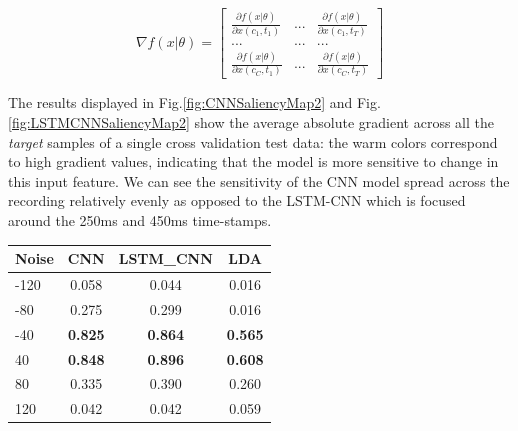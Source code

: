 \documentclass[
12pt, %
english, %
doublespacing, %
headsepline, %
]{MastersDoctoralThesis} %
\begin{document}
	\begin{equation}\label{eq:4}
	\nabla f\left( {x|\theta } \right) = \left[ {\begin{array}{*{20}{c}}
		{\frac{{\partial f\left( {x|\theta } \right)}}{{\partial x\left( {{c_1},{t_1}} \right)}}}&{...}&{\frac{{\partial f\left( {x|\theta } \right)}}{{\partial x\left( {{c_1},{t_T}} \right)}}}\\
		{...}&{...}&{...}\\
		{\frac{{\partial f\left( {x|\theta } \right)}}{{\partial x\left( {{c_C},{t_1}} \right)}}}&{...}&{\frac{{\partial f\left( {x|\theta } \right)}}{{\partial x\left( {{c_C},{t_T}} \right)}}}
		\end{array}} \right]
	\end{equation}


The results displayed in Fig.\ref{fig:CNNSaliencyMap2} and Fig.\ref{fig:LSTMCNNSaliencyMap2} show the average absolute gradient across all the \textit{target} samples of a single cross validation test data: the warm colors correspond to high gradient values, indicating that the model is more sensitive to change in this input feature. We can see the sensitivity of the CNN model spread across the recording relatively evenly as opposed to the LSTM-CNN which is focused around the 250ms and 450ms time-stamps.

\begin{small}
	\label{table:ResistenceToNoise}
	\centering
	
	\begin{tabular}{l|ccc}
		\toprule
		{Noise} &  CNN &  LSTM\_CNN &  LDA\\
		\midrule
		-120  &         0.058 &              0.044 &         0.016 \\
		-80   &         0.275 &              0.299 &         0.016 \\
		-40   &         \textbf{0.825} &              \textbf{0.864} &  \textbf{0.565} \\
		40   &         \textbf{0.848} &              \textbf{0.896} &   \textbf{0.608} \\
		80   &         0.335 &              0.390 &         0.260 \\
		120  &         0.042 &              0.042 &         0.059 \\
		\bottomrule
	\end{tabular}
	
\end{small}
\end{document}
